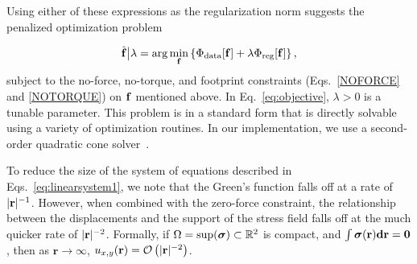 \documentclass[aps,prl,reprint,twocolumn,groupedaddress,showpacs]{revtex4}
\DeclarePairedDelimiter{\norm}{\lVert}{\rVert}
\newcommand{\bsigma}{{\boldsymbol\sigma}}
\def\d{{\bf d}}
\def\f{{\bf f}}
\def\r{{\bf r}}
\def\u{{\bf u}}
\begin{document}
Using either of these expressions as the regularization norm
suggests the penalized optimization problem

\begin{equation}
\hat{\f} \big\vert \lambda = \arg\min_{\f} \left\{ \Phi_{\textrm{data}}[\f] + 
\lambda\Phi_{\textrm{reg}}[\f] \right\},
\label{eq:objective}
\end{equation}
%
subject to the no-force, no-torque, and footprint constraints
(Eqs.~\ref{NOFORCE} and \ref{NOTORQUE}) on $\f$ mentioned above.
In Eq.~\ref{eq:objective}, $\lambda>0$ is a tunable parameter. This
problem is in a standard form that is directly solvable using a
variety of optimization routines.  In our implementation, we use a
second-order quadratic cone solver~\cite{cvxpy}.

To reduce the size of the system of equations described in
Eqs.~\ref{eq:linearsystem1}, we note that the Green's function falls
off at a rate of $|\r|^{-1}$. However, when combined with the
zero-force constraint, the relationship between the
displacements and the support of the stress field falls off at the
much quicker rate of $|\r|^{-2}$. Formally, if 
%
%
$\Omega = {\rm sup}(\bsigma)\subset \mathbb{R}^2$ is compact, and
 $\int \bsigma(\r)\d\r = \mathbf{0}$, then
as $\mathbf{r}\to\infty$, $u_{x,y}(\r) = \mathcal{O}\left( |\r|^{-2} \right)$.


%
\end{document}
